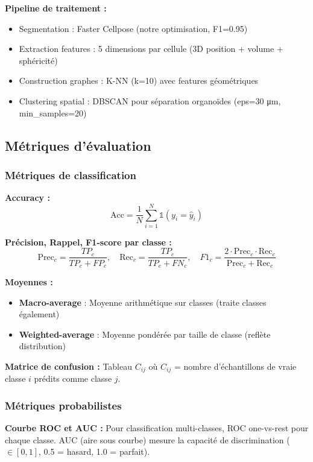 \textbf{Pipeline de traitement :}
\begin{itemize}
    \item Segmentation : Faster Cellpose (notre optimisation, F1=0.95)
    \item Extraction features : 5 dimensions par cellule (3D position + volume + sphéricité)
    \item Construction graphes : K-NN (k=10) avec features géométriques
    \item Clustering spatial : DBSCAN pour séparation organoïdes (eps=30 μm, min\_samples=20)
\end{itemize}

\subsection{Métriques d'évaluation}

\subsubsection{Métriques de classification}

\textbf{Accuracy :}
\[
\text{Acc} = \frac{1}{N}\sum_{i=1}^N \mathbb{1}(y_i = \hat{y}_i)
\]

\textbf{Précision, Rappel, F1-score par classe :}
\[
\text{Prec}_c = \frac{TP_c}{TP_c + FP_c}, \quad \text{Rec}_c = \frac{TP_c}{TP_c + FN_c}, \quad F1_c = \frac{2 \cdot \text{Prec}_c \cdot \text{Rec}_c}{\text{Prec}_c + \text{Rec}_c}
\]

\textbf{Moyennes :}
\begin{itemize}
    \item \textbf{Macro-average} : Moyenne arithmétique sur classes (traite classes également)
    \item \textbf{Weighted-average} : Moyenne pondérée par taille de classe (reflète distribution)
\end{itemize}

\textbf{Matrice de confusion :}
Tableau $C_{ij}$ où $C_{ij}$ = nombre d'échantillons de vraie classe $i$ prédits comme classe $j$.

\subsubsection{Métriques probabilistes}

\textbf{Courbe ROC et AUC :}
Pour classification multi-classes, ROC one-vs-rest pour chaque classe. AUC (aire sous courbe) mesure la capacité de discrimination ($\in [0,1]$, 0.5 = hasard, 1.0 = parfait).

